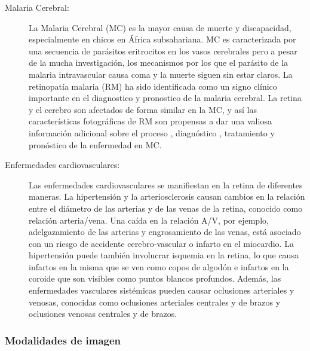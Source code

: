 \begin{description}
     
\item[Malaria Cerebral:]La Malaria Cerebral (MC) es la mayor causa de muerte y discapacidad, especialmente en chicos en África subsahariana. MC es caracterizada por una secuencia de parásitos eritrocitos
en los vasos cerebrales pero a pesar de la mucha  investigación, los mecanismos por los que el parásito de la malaria intravascular causa coma y la muerte siguen sin estar claros.
La retinopatía  malaria (RM) ha sido identificada como un signo clínico importante en el diagnostico y pronostico de la malaria cerebral. La retina y el cerebro son afectados de forma similar en la MC, y así las características fotográficas de RM son propensas a dar una valiosa información adicional sobre el proceso , diagnóstico , tratamiento y pronóstico de la enfermedad en MC.

     
     \item[Enfermedades cardiovasculares:] Las enfermedades cardiovasculares se manifiestan en la retina de diferentes maneras. La hipertensión y la arteriosclerosis causan cambios en la relación entre el diámetro de las arterias y de las venas de la retina, conocido como relación arteria/vena. Una caída en la relación A/V, por ejemplo, adelgazamiento de las arterias y engrosamiento de las venas, está asociado con un riesgo de accidente cerebro-vascular o infarto en el miocardio. La hipertensión puede también involucrar isquemia en la retina, lo que causa infartos en la misma que se ven como copos de algodón e infartos en la coroide que son visibles como puntos blancos profundos. Además, las enfermedades vasculares sistémicas pueden causar oclusiones arteriales y venosas, conocidas como oclusiones arteriales centrales y de brazos y oclusiones venosas centrales y de brazos. \cite{fraz2012blood}
\end{description}






			\subsubsection{Modalidades de imagen}


